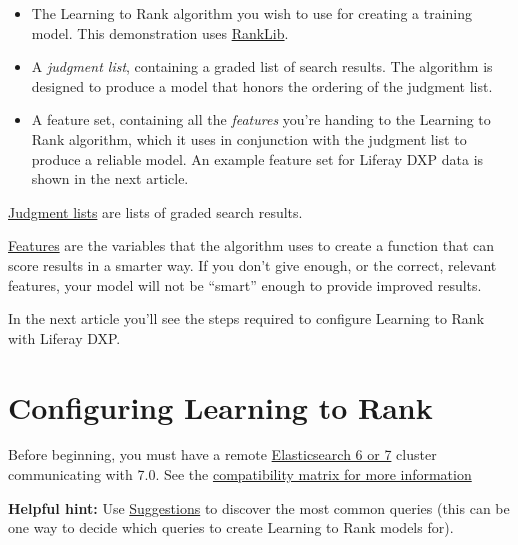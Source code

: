 \begin{itemize}
\item
  The Learning to Rank algorithm you wish to use for creating a training
  model. This demonstration uses
  \href{https://sourceforge.net/p/lemur/wiki/RankLib/}{RankLib}.
\item
  A \emph{judgment list}, containing a graded list of search results.
  The algorithm is designed to produce a model that honors the ordering
  of the judgment list.
\item
  A feature set, containing all the \emph{features} you're handing to
  the Learning to Rank algorithm, which it uses in conjunction with the
  judgment list to produce a reliable model. An example feature set for
  Liferay DXP data is shown in the next article.
\end{itemize}

\href{https://elasticsearch-learning-to-rank.readthedocs.io/en/latest/core-concepts.html\#judgments-expression-of-the-ideal-ordering}{Judgment
lists} are lists of graded search results.

\href{https://elasticsearch-learning-to-rank.readthedocs.io/en/latest/core-concepts.html\#features-the-raw-material-of-relevance}{Features}
are the variables that the algorithm uses to create a function that can
score results in a smarter way. If you don't give enough, or the
correct, relevant features, your model will not be ``smart'' enough to
provide improved results.

In the next article you'll see the steps required to configure Learning
to Rank with Liferay DXP.

\chapter{Configuring Learning to
Rank}\label{configuring-learning-to-rank}

Before beginning, you must have a remote
\href{/docs/7-2/deploy/-/knowledge_base/d/upgrading-to-elasticsearch-7}{Elasticsearch
6 or 7} cluster communicating with 7.0. See the
\href{https://help.liferay.com/hc/en-us/articles/360016511651\#Liferay-Enterprise-Search}{compatibility
matrix for more information}

\noindent\hrulefill

\textbf{Helpful hint:} Use
\href{/docs/7-2/user/-/knowledge_base/u/searching-for-assets\#search-suggestions}{Suggestions}
to discover the most common queries (this can be one way to decide which
queries to create Learning to Rank models for).

